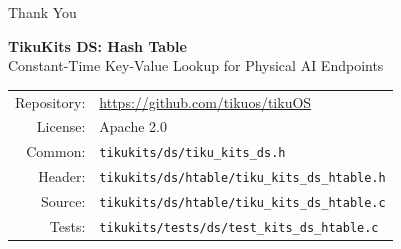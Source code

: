 \documentclass[aspectratio=169, 10pt]{beamer}
\begin{document}
\begin{frame}{Thank You}
\begin{center}
\Large\textbf{TikuKits DS: Hash Table}\\[0.5em]
\normalsize Constant-Time Key-Value Lookup for Physical AI Endpoints\\[1.5em]

\begin{tabular}{rl}
  Repository: & \url{https://github.com/tikuos/tikuOS} \\
  License:    & Apache 2.0 \\
  Common:     & \texttt{tikukits/ds/tiku\_kits\_ds.h} \\
  Header:     & \texttt{tikukits/ds/htable/tiku\_kits\_ds\_htable.h} \\
  Source:     & \texttt{tikukits/ds/htable/tiku\_kits\_ds\_htable.c} \\
  Tests:      & \texttt{tikukits/tests/ds/test\_kits\_ds\_htable.c} \\
\end{tabular}
\end{center}
\end{frame}
\end{document}
